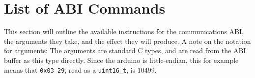 \newcommand{\abispec}[6]{
\subsection{\texttt{#1}}

\begin{tabularx}{\textwidth}{>{\hsize=.5\hsize}XX}
\textbf{Instruction byte:}               & \texttt{#2} \\
\textbf{Argument bytes:}                 & #3 \\
\textbf{Argument type(s):}               & \texttt{#4} \\
\textbf{Action:}                         & #5 \\
\textbf{Relation to low-level commands:} & #6 \\
\end{tabularx}
}

\section{List of ABI Commands} \label{abi}

This section will outline the available instructions for the communications
ABI, the arguments they take, and the effect they will produce. A note on the
notation for arguments: The arguments are standard C types, and are read from
the ABI buffer as this type directly. Since the arduino is little-endian, this
for example means that \texttt{0x03 29}, read as a \texttt{uint16\_t}, is
10499.

